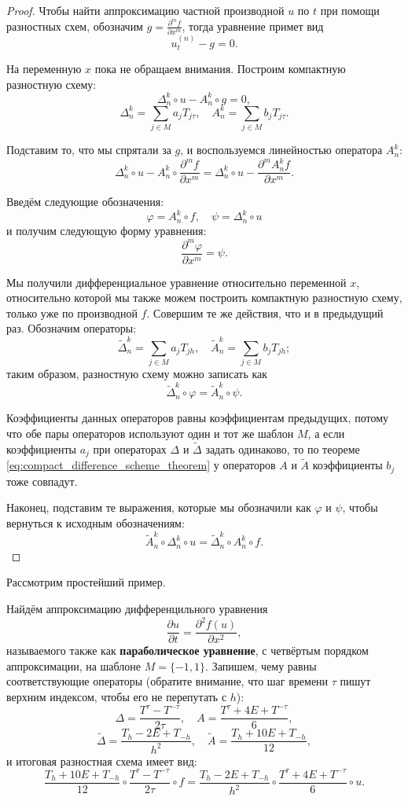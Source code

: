 \documentclass[../main.tex]{subfile}
\begin{document}
\begin{proof}
	Чтобы найти аппроксимацию частной производной $u$ по $t$ при помощи
	разностных схем, обозначим $g=\frac{\partial^mf}{\partial x^m}$,
	тогда уравнение примет вид
	\[u^{(n)}_t-g=0.\]

	На переменную $x$ пока не обращаем внимания. Построим компактную
	разностную схему:
	\[\Delta_n^k\circ u-A_n^k\circ g=0,\]
	\[\Delta_n^k=\sum_{j\in M}a_jT_{j\tau},\quad A_n^k=\sum_{j\in M}b_j
	T_{j\tau}.\]

	Подставим то, что мы спрятали за $g$, и воспользуемся линейностью
	оператора $A_n^k$:
	\[\Delta_n^k\circ u-A_n^k\circ \frac{\partial^mf}{\partial x^m}=
	\Delta_n^k\circ u-\frac{\partial^mA_n^kf}{\partial x^m}.\]

	Введём следующие обозначения:
	\[\varphi=A_n^k\circ f,\quad\psi=\Delta_n^k\circ u\]
	и получим следующую форму уравнения:
	\[\frac{\partial^m\varphi}{\partial x^m}=\psi.\]

	Мы получили дифференциальное уравнение относительно переменной $x$,
	относительно которой мы также можем построить компактную разностную
	схему, только уже по производной $f$. Совершим те же действия, что
	и в предыдущий раз. Обозначим операторы:
	\[\widetilde{\Delta}_n^k=\sum_{j\in M}a_jT_{jh},\quad
	\widetilde{A}_n^k=\sum_{j\in M}b_jT_{jh};\]
	таким образом, разностную схему можно записать как
	\[\widetilde{\Delta}_n^k\circ\varphi=\widetilde{A}_n^k\circ\psi.\]

	Коэффициенты данных операторов равны коэффициентам предыдущих,
	потому что обе пары операторов используют один и тот же шаблон $M$,
	а если коэффициенты $a_j$ при операторах $\Delta$ и $\widetilde{\Delta}$
	задать одинаково, то по теореме
	\eqref{eq:compact_difference_scheme_theorem} у операторов $A$ и
	$\widetilde{A}$ коэффициенты $b_j$ тоже совпадут.

	Наконец, подставим те выражения, которые мы обозначили как $\varphi$ и
	$\psi$, чтобы вернуться к исходным обозначениям:
	\[\widetilde{A}_n^k\circ\Delta_n^k\circ u=\widetilde{\Delta}_n^k\circ
	A_n^k\circ f.\]
\end{proof}

Рассмотрим простейший пример.

\begin{example}
	Найдём аппроксимацию дифференцильного уравнения
	\[\frac{\partial u}{\partial t}=\frac{\partial^2f(u)}{\partial x^2},\]
	называемого также как \textbf{параболическое уравнение}, с четвёртым
	порядком аппроксимации, на шаблоне $M=\{-1,1\}$. Запишем, чему равны
	соответствующие операторы (обратите внимание, что шаг времени $\tau$
	пишут верхним индексом, чтобы его не перепутать с $h$):
	\[\Delta=\frac{T^\tau-T^{-\tau}}{2\tau},\quad A=\frac{T^\tau+4E+
	T^{-\tau}}{6},\]
	\[\widetilde{\Delta}=\frac{T_h-2E+T_{-h}}{h^2},\quad
	\widetilde{A}=\frac{T_h+10E+T_{-h}}{12},\]
	и итоговая разностная схема имеет вид:
	\[\frac{T_h+10E+T_{-h}}{12}\circ\frac{T^\tau-T^{-\tau}}{2\tau}\circ f=
	\frac{T_h-2E+T_{-h}}{h^2}\circ\frac{T^\tau+4E+T^{-\tau}}{6}\circ u.\]
\end{example}
\newpage
\end{document}
